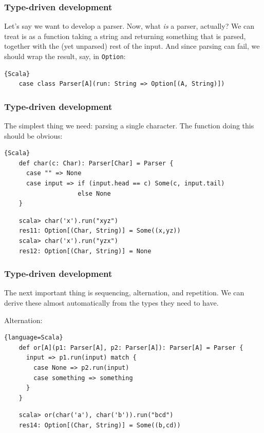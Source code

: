 \documentclass{beamer}
\begin{document}
\begin{frame}[containsverbatim]
  \frametitle{Type-driven development} 

  Let's say we want to develop a parser. Now, what \textit{is} a parser, actually? We can treat is
  as a function taking a string and returning something that is parsed, together with the (yet
  unparsed) rest of the input. And since parsing can fail, we should wrap the result, say, in
  \texttt{Option}: 
  
  \begin{lstlisting}{Scala}
    case class Parser[A](run: String => Option[(A, String)])
  \end{lstlisting}

  
\end{frame}

\begin{frame}[containsverbatim]
  \frametitle{Type-driven development} 

  The simplest thing we need: parsing a single character. The function doing this should be obvious:
  
  \begin{lstlisting}{Scala}
    def char(c: Char): Parser[Char] = Parser {
      case "" => None
      case input => if (input.head == c) Some(c, input.tail)
                    else None
    }
  \end{lstlisting}

  \begin{lstlisting}
    scala> char('x').run("xyz")
    res11: Option[(Char, String)] = Some((x,yz))
    scala> char('x').run("yzx")
    res12: Option[(Char, String)] = None
  \end{lstlisting}
\end{frame}

\begin{frame}[containsverbatim]
  \frametitle{Type-driven development} 

  The next important thing is sequencing, alternation, and repetition. We can derive these almost
  automatically from the types they need to have. 

  Alternation:

  \begin{lstlisting}{language=Scala}
    def or[A](p1: Parser[A], p2: Parser[A]): Parser[A] = Parser {
      input => p1.run(input) match {
        case None => p2.run(input)
        case something => something
      }
    }
  \end{lstlisting}

  \begin{lstlisting}
    scala> or(char('a'), char('b')).run("bcd")
    res14: Option[(Char, String)] = Some((b,cd))
  \end{lstlisting}
  
\end{frame}
\end{document}
